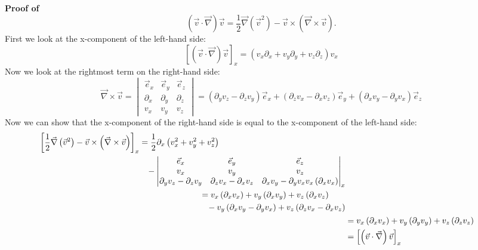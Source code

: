 \begin{framed}
\textbf{Proof of}
\begin{equation}
\left(\vec{v}\cdot\vec{\nabla}\right)\vec{v}=\frac{1}{2}\vec{\nabla}\left(\vec{v}^2\right)-\vec{v}\times\left(\vec{\nabla}\times\vec{v}\right).
\end{equation}
First we look at the x-component of the left-hand side:
\begin{equation}
\left[\left(\vec{v}\cdot\vec{\nabla}\right)\vec{v}\right]_x = \left(v_x\partial_x+v_y\partial_y+v_z\partial_z\right)v_x
\end{equation}
Now we look at the rightmost term on the right-hand side:
\begin{equation}
\vec{\nabla}\times\vec{v} = \begin{vmatrix}
\vec{e}_x & \vec{e}_y & \vec{e}_z \\
\partial_x & \partial_y & \partial_z \\
v_x & v_y & v_z
\end{vmatrix} =
\left(\partial_yv_z-\partial_zv_y\right)\vec{e}_x +
\left(\partial_zv_x-\partial_xv_z\right)\vec{e}_y +
\left(\partial_xv_y-\partial_yv_x\right)\vec{e}_z
\end{equation}
Now we can show that the x-component of the right-hand side is equal to the x-component of the left-hand side:
\begin{align}
\begin{split}
\left[\frac{1}{2}\vec{\nabla}\left(\vec{v}^2\right)-\vec{v}\times\left(\vec{\nabla}\times\vec{v}\right)\right]_x &= \frac{1}{2}\partial_x\left(v_x^2+v_y^2+v_z^2\right)\\
&\hspace{3mm}- \begin{vmatrix}
\vec{e}_x & \vec{e}_y & \vec{e}_z \\
v_x & v_y & v_z \\
\partial_yv_z-\partial_zv_y & \partial_zv_x-\partial_xv_z & \partial_xv_y-\partial_yv_xv_x\left(\partial_xv_x\right)
\end{vmatrix}_x
\end{split}\\
\begin{split}
&= v_x\left(\partial_xv_x\right) + v_y\left(\partial_xv_y\right) + v_z\left(\partial_xv_z\right)\\
&\hspace{3mm}- v_y\left(\partial_xv_y-\partial_yv_x\right) + v_z\left(\partial_zv_x-\partial_xv_z\right)
\end{split}\\
&= v_x\left(\partial_xv_x\right)+v_y\left(\partial_yv_y\right)+v_z\left(\partial_zv_z\right)\\
&= \left[\left(\vec{v}\cdot\vec{\nabla}\right)\vec{v}\right]_x
\end{align}
\end{framed}


